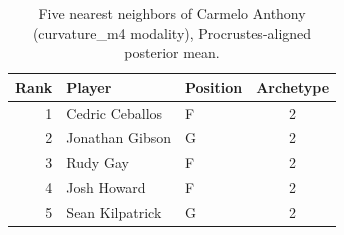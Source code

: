 \begin{table}[htbp]
  \centering\small
  \begin{tabular}{rllc}
    \toprule
    Rank & Player & Position & Archetype \\
    \midrule
    1 & Cedric Ceballos & F & 2 \\
    2 & Jonathan Gibson & G & 2 \\
    3 & Rudy Gay & F & 2 \\
    4 & Josh Howard & F & 2 \\
    5 & Sean Kilpatrick & G & 2 \\
    \bottomrule
  \end{tabular}
  \caption{Five nearest neighbors of Carmelo Anthony (curvature_m4 modality), Procrustes-aligned posterior mean.}
  \label{tab:Carmelo_Anthony_neighbors_curvature_m4}
\end{table}

